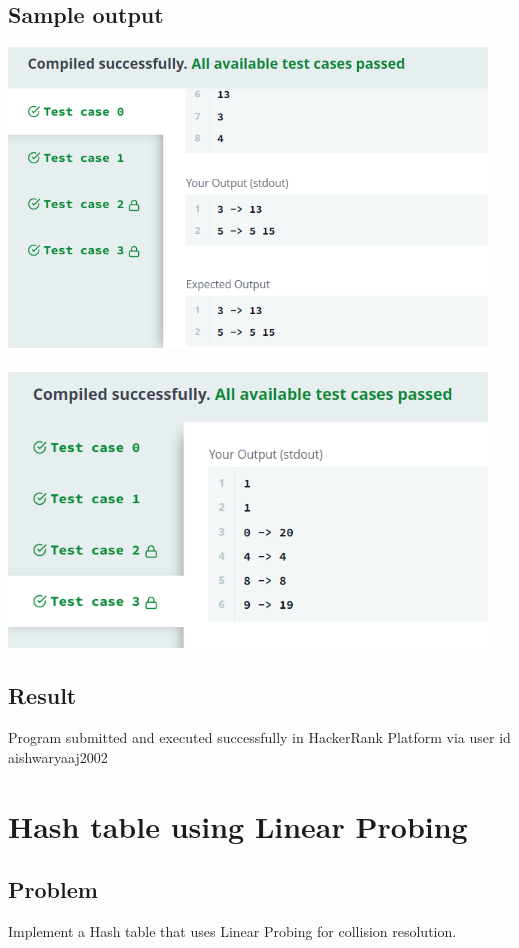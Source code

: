 \documentclass[14pt, letterpaper]{article}
\begin{document}
\subsection{Sample output}
\includegraphics[width=5in]{images/htchain.png}\\ \\
\includegraphics[width=5in]{images/htchain2.png}
\subsection{Result}
Program submitted and executed successfully in HackerRank Platform via user id aishwaryaaj2002
\newpage
\section{Hash table using Linear Probing}

\subsection{Problem}
Implement a Hash table that uses Linear Probing for collision resolution.
\end{document}

